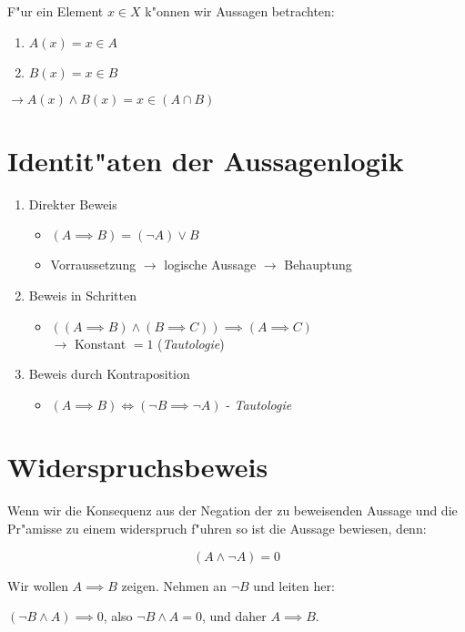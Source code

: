 \documentclass[oneside,fontsize=11pt,paper=a4,BCOR=0mm,DIV=12,automark,headsepline]{scrbook}
\theoremstyle{remark}
\theoremstyle{definition}
\theoremstyle{definition}
\theoremstyle{remark}
\begin{document}
\begin{exa}
F"ur ein Element \(x\in X\) k"onnen wir Aussagen betrachten:
\begin{enumerate}
\item \(A(x)=x\in A\)
\item \(B(x)=x\in B\)
\end{enumerate}
\(\longrightarrow A(x)\wedge B(x)=x\in (A\cap B)\)
\end{exa}

\section{Identit"aten der Aussagenlogik}
\label{sec:orgd743b6e}
\begin{relation}
\begin{enumerate}
\item Direkter Beweis 
\begin{itemize}
\item \((A\implies B) = (\neg A)\vee B\)
\item Vorraussetzung \(\rightarrow\) logische Aussage \(\rightarrow\) Behauptung
\end{itemize}
\item Beweis in Schritten
\begin{itemize}
\item \(((A\implies B)\wedge (B\implies C))\implies (A\implies C)\) \\
\(\rightarrow\) Konstant \(=1\) (\emph{Tautologie})
\end{itemize}
\item Beweis durch Kontraposition
\begin{itemize}
\item \((A\implies B) \iff (\neg B \implies \neg A)\) - \emph{Tautologie}
\end{itemize}
\end{enumerate}
\end{relation}

\section{Widerspruchsbeweis}
\label{sec:org54c9d02}
Wenn wir die Konsequenz aus der Negation der zu beweisenden Aussage und die
Pr"amisse zu einem widerspruch f"uhren so ist die Aussage bewiesen, denn:
\begin{relation}
\[(A\wedge \neg A)=0\]
\end{relation}


Wir wollen \(A\implies B\) zeigen.
Nehmen an \(\neg B\) und leiten her:\\
\begin{relation}
\((\neg B \wedge A)\implies 0\), also \(\neg B\wedge A = 0\), und daher \(A\implies
B\).
\end{relation}
\end{document}
